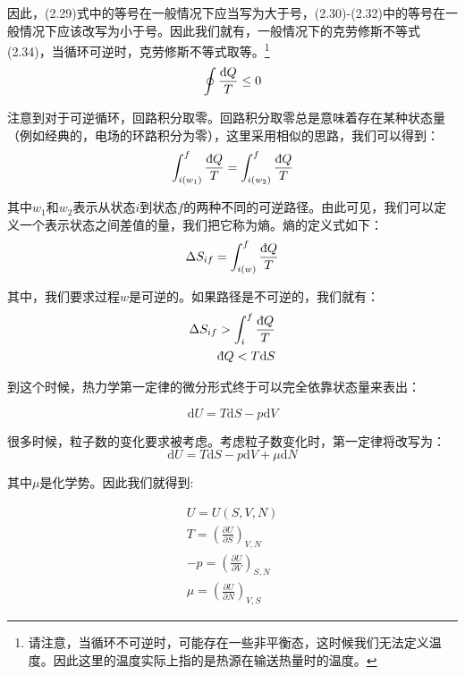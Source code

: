 \documentclass[a4paper, 10pt, openany]{book}%
\begin{document}
因此，(2.29)式中的等号在一般情况下应当写为大于号，(2.30)-(2.32)中的等号在一般情况下应该改写为小于号。因此我们就有，一般情况下的克劳修斯不等式(2.34)，当循环可逆时，克劳修斯不等式取等。\footnote{请注意，当循环不可逆时，可能存在一些非平衡态，这时候我们无法定义温度。因此这里的温度实际上指的是热源在输送热量时的温度。}
\begin{equation}
  \oint \frac{\text{\dj}Q}{T}\leq0
\end{equation}

注意到对于可逆循环，回路积分取零。回路积分取零总是意味着存在某种状态量（例如经典的，电场的环路积分为零），这里采用相似的思路，我们可以得到：
\begin{equation}
  \int_{i(w_1)}^f\frac{\text{\dj}Q}{T}=\int_{i(w_2)}^f\frac{\text{\dj}Q}{T}
\end{equation}

其中$w_1$和$w_2$表示从状态$i$到状态$f$的两种不同的可逆路径。由此可见，我们可以定义一个表示状态之间差值的量，我们把它称为熵。熵的定义式如下：
\begin{equation}
  \Delta S_{if}=\int_{i(w)}^f\frac{\text{\dj}Q}{T}
\end{equation}

其中，我们要求过程$w$是可逆的。如果路径是不可逆的，我们就有：
\begin{align}
\Delta S_{if}>\int_i^f\frac{\text{\dj}Q}{T}\\
\text{\dj}Q<T\mathrm{d}S
\end{align}

到这个时候，热力学第一定律的微分形式终于可以完全依靠状态量来表出：

\begin{equation}
\mathrm{d}U=T\mathrm{d}S-p\mathrm{d}V
\end{equation}

很多时候，粒子数的变化要求被考虑。考虑粒子数变化时，第一定律将改写为：
\begin{equation}
\mathrm{d}U=T\mathrm{d}S-p\mathrm{d}V+\mu\mathrm{d}N
\end{equation}

其中$\mu$是化学势。因此我们就得到:

\begin{align}
U=U(S,V,N)\\
T=\left(\frac{\partial U}{\partial S}\right)_{V,N}\\
-p=\left(\frac{\partial U}{\partial V}\right)_{S,N}\\
\mu=\left(\frac{\partial U}{\partial N}\right)_{V,S}
\end{align}
\end{document}
